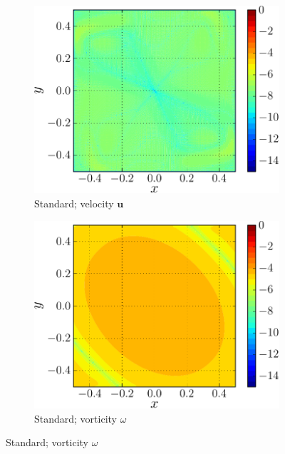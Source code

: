 	
	\begin{figure}[h]
     \centering
     \begin{subfigure}[t]{0.45\textwidth}
             \includegraphics[width=\linewidth]{./figures/hybrid/lambOseent2/lambOseen_uncoupled_vErrorFinal_compressed-crop.pdf}
             \caption{Standard; velocity $\mathbf{u}$}
             \label{fig:lambOseen_uncoupled_vErrorFinal}
     \end{subfigure}%
     \qquad %
     \begin{subfigure}[t]{0.45\textwidth}
             \includegraphics[width=\linewidth]{./figures/hybrid/lambOseent2/lambOseen_uncoupled_wErrorFinal_compressed-crop.pdf}
             \caption{Standard; vorticity $\omega$}
             \label{fig:lambOseen_uncoupled_wErrorFinal}
     \end{subfigure}%
       

\end{figure}
